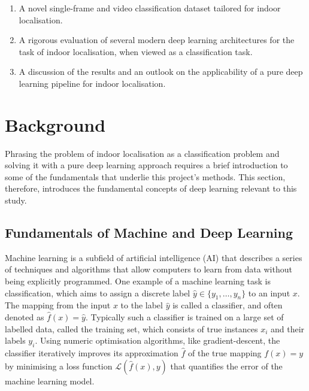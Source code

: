 \documentclass[a4paper]{article}
\begin{document}
\begin{enumerate} 

  \item A novel single-frame and video classification dataset tailored for
    indoor localisation.

  \item A rigorous evaluation of several modern deep learning architectures for
    the task of indoor localisation, when viewed as a classification task.

  \item A discussion of the results and an outlook on the applicability of a
    pure deep learning pipeline for indoor localisation.

\end{enumerate}


\section{Background} %
\label{sec:background}

Phrasing the problem of indoor localisation as a classification problem and
solving it with a pure deep learning approach requires a brief introduction to
some of the fundamentals that underlie this project's methods. This section,
therefore, introduces the fundamental concepts of deep learning relevant to this
study.

\subsection{Fundamentals of Machine and Deep Learning}

Machine learning is a subfield of artificial intelligence (AI) that describes a
series of techniques and algorithms that allow computers to learn from data
without being explicitly programmed. One example of a machine learning task is
classification, which aims to assign a discrete label $\hat{y} \in \{y_1,
\ldots, y_n\}$ to an input $x$. The mapping from the input $x$ to the label
$\hat{y}$ is called a classifier, and often denoted as $\hat{f}(x) = \hat{y}$.
Typically such a classifier is trained on a large set of labelled data, called
the training set, which consists of true instances $x_i$ and their labels $y_i$.
Using numeric optimisation algorithms, like gradient-descent, the classifier
iteratively improves its approximation $\hat{f}$ of the true mapping $f(x) = y$
by minimising a loss function $\mathcal{L}(\hat{f}(x), y)$ that quantifies the
error of the machine learning model.
\end{document}
